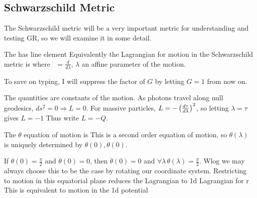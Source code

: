 \documentclass{article}
\begin{document}
\subsection{Schwarzschild Metric}
The Schwarzschild metric will be a very important metric for understanding and testing GR, so we will examine it in some detail. 
\begin{definition}
The  has line element 
Equivalently the Lagrangian for motion in the Schwarzschild metric is 
where $\dot{\phantom{r}} = \frac{d}{d\lambda}$, $\lambda$ an affine parameter of the motion. 
\end{definition}
To save on typing, I will suppress the factor of $G$ by letting $G=1$ from now on. 
\begin{lemma}
The quantities 
are constants of the motion. As photons travel along null geodesics, $ds^2 = 0 \Rightarrow L=0$. For massive particles, $L = -\left( \frac{d\tau}{d\lambda} \right)^2$, so letting $\lambda = \tau$ gives $L=-1$ Thus write $L = -Q$.
\end{lemma}
\begin{lemma}
The $\theta$ equation of motion is 
This is a second order equation of motion, so $\theta(\lambda)$ is uniquely determined by $\theta(0),\dot{\theta}(0)$. 
\end{lemma}

\begin{corollary}
If $\theta(0) = \frac{\pi}{2}$ and $\dot{\theta}(0) = 0$, then $\ddot{\theta}(0) = 0$ and $\forall \lambda \,  \theta(\lambda) = \frac{\pi}{2}$. Wlog we may always choose this to be the case by rotating our coordinate system. Restricting to motion in this equatorial plane reduces the Lagrangian to 1d Lagrangian for r 
This is equivalent to motion in the 1d potential 
\end{corollary}
\end{document}
